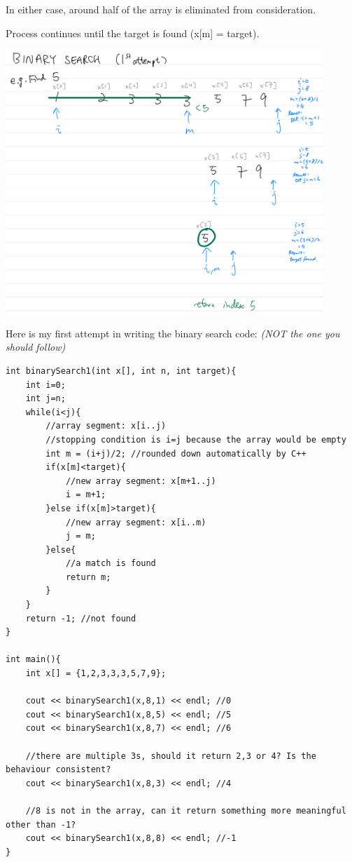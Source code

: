 In either case, around half of the array is eliminated from consideration.

Process continues until the target is found (x[m] = target).
\vspace{3mm}

\includegraphics[width=12cm]{images/ch7-binarysearch1.png}
\pagebreak

Here is my first attempt in writing the binary search code: \textit{(NOT the one you should follow)}

\begin{lstlisting}
int binarySearch1(int x[], int n, int target){
    int i=0;
    int j=n;
    while(i<j){
        //array segment: x[i..j)
        //stopping condition is i=j because the array would be empty
        int m = (i+j)/2; //rounded down automatically by C++
        if(x[m]<target){
            //new array segment: x[m+1..j)
            i = m+1;
        }else if(x[m]>target){
            //new array segment: x[i..m)
            j = m;
        }else{
            //a match is found
            return m;
        }
    }
    return -1; //not found
}

int main(){
    int x[] = {1,2,3,3,3,5,7,9};
 
    cout << binarySearch1(x,8,1) << endl; //0
    cout << binarySearch1(x,8,5) << endl; //5
    cout << binarySearch1(x,8,7) << endl; //6

    //there are multiple 3s, should it return 2,3 or 4? Is the behaviour consistent?
    cout << binarySearch1(x,8,3) << endl; //4

    //8 is not in the array, can it return something more meaningful other than -1?
    cout << binarySearch1(x,8,8) << endl; //-1
}
\end{lstlisting}

